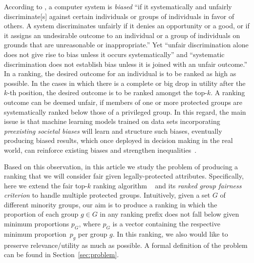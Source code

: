 According to \citet{friedman1996bias}, a computer system is \emph{biased} ``if it systematically and unfairly discriminate[s] against certain individuals or groups of individuals in favor of others.
%
A system discriminates unfairly if it denies an opportunity or a good, or if it assigns an undesirable outcome to an individual or a group of individuals on grounds that are unreasonable or inappropriate.''
%
Yet ``unfair discrimination alone does not give rise to bias unless it occurs systematically'' and ``systematic discrimination does not establish bias unless it is joined with an unfair outcome.''
%
In a ranking, the desired outcome for an individual is to be ranked as high as possible. In the cases in which there is a complete or big drop in utility after the $k$-th position, the desired outcome is to be ranked amongst the top-$k$. A ranking outcome can be deemed unfair, if members of one or more protected groups are systematically ranked below those of a privileged group.
%
%
In this regard, the main issue is that machine learning models trained on data sets incorporating \textit{preexisting societal biases} will learn and structure such biases, eventually producing biased results, which once deployed in decision making in the real world, can reinforce existing biases and strengthen inequalities~\cite{oneil2016weapons}. 
%
%

Based on this observation, in this article we study the problem of producing a ranking that we will consider fair given legally-protected attributes.
%
Specifically, here we extend the fair top-$k$ ranking algorithm \algoFAIR ~\cite{zehlike2017fair} and its \emph{ranked group fairness criterion} to handle multiple protected groups.
%
Intuitively, given a set $G$ of different minority groups, our aim is to produce a ranking in which the proportion of each group $g \in G$ in any ranking prefix does not fall below given minimum proportions $p_G$, where $p_G$ is a vector containing the respective minimum proportion~$p_g$ per group $g$.
%
In this ranking, we also would like to preserve relevance/utility as much as possible.
%
A formal definition of the problem can be found in Section~\ref{sec:problem}.

